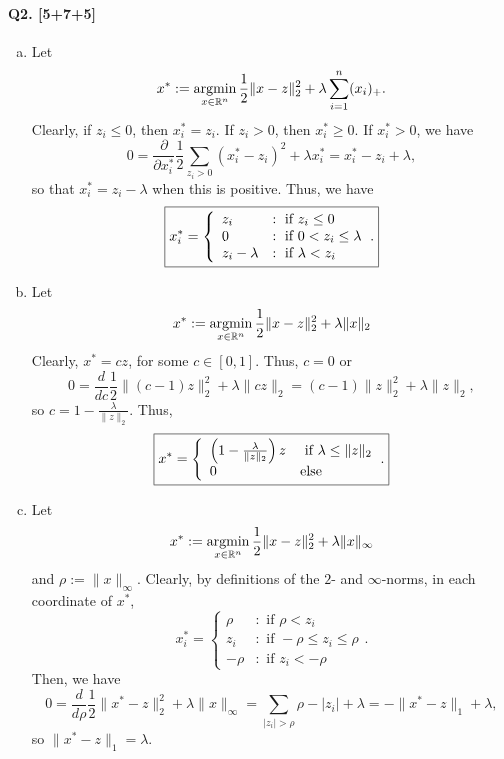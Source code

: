 \documentclass[11pt]{article}
\newcommand{\R}{\mathbb{R}}                 %
\newcommand{\argmin}{\operatornamewithlimits{argmin}}   %
\begin{document}
\paragraph{Q2. [5+7+5]}
\begin{enumerate}[a)]
\item Let
\[x^* := \argmin_{x \in \R^n} \frac{1}{2}\|x - z\|_2^2
                                        + \lambda\sum_{i = 1}^n (x_i)_+.\]
Clearly, if $z_i \leq 0$, then $x_i^* = z_i$. If $z_i > 0$, then
$x^*_i \geq 0$. If $x^*_i > 0$, we have
\[0
    = \frac{\partial}{\partial x^*_i}
        \frac12 \sum_{z_i > 0} (x^*_i - z_i)^2 + \lambda x^*_i
    = x^*_i - z_i + \lambda,
\]
so that $x^*_i = z_i - \lambda$ when this is positive. Thus, we have
\[\mbox{\fbox{$\displaystyle x_i^*
 =  \left\{
        \begin{array}{ll}
            z_i             & : \mbox{ if } z_i \leq 0              \\
            0               & : \mbox{ if } 0 < z_i \leq \lambda    \\
            z_i - \lambda   & : \mbox{ if } \lambda < z_i           \\
        \end{array}
    \right.$.}}
\]

\item Let
\[x^* := \argmin_{x \in \R^n} \frac{1}{2}\|x - z\|_2^2 + \lambda\|x\|_2\]
Clearly, $x^* = cz$, for some $c \in [0,1]$. Thus, $c = 0$ or
\[0
    = \frac{d}{dc} \frac{1}{2}\|(c - 1)z\|_2^2 + \lambda\|cz\|_2
    = (c - 1)\|z\|_2^2 + \lambda\|z\|_2,
\]
so $c = 1 - \frac{\lambda}{\|z\|_2}$. Thus,
\[\mbox{\fbox{$\displaystyle x^*
    = \left\{
        \begin{array}{ll}
            \left(1 - \frac{\lambda}{\|z\|_2}\right)z
                                        & \mbox{ if } \lambda \leq \|z\|_2 \\
            0   & \mbox{else}
        \end{array}
    \right.$.}}
\]

\item Let
\[x^* := \argmin_{x \in \R^n} \frac{1}{2}\|x - z\|_2^2 + \lambda\|x\|_\infty\]
and $\rho := \|x\|_\infty$. Clearly, by definitions of the $2$- and
$\infty$-norms, in each coordinate of $x^*$,
\[x_i^*
 =  \left\{
        \begin{array}{ll}
            \rho    & : \mbox{ if } \rho < z_i                  \\
            z_i     & : \mbox{ if } -\rho \leq z_i \leq \rho    \\
            -\rho   & : \mbox{ if } z_i < -\rho
        \end{array}
    \right..
\]
Then, we have
\[0 = \frac{d}{d\rho} \frac{1}{2}\|x^* - z\|_2^2 + \lambda\|x\|_\infty
    = \sum_{|z_i| > \rho} \rho - |z_i| + \lambda
    = -\|x^* - z\|_1 + \lambda,
\]
so $\|x^* - z\|_1 = \lambda$.
\end{enumerate}
\end{document}
